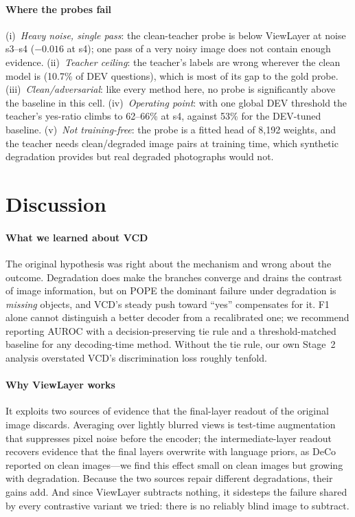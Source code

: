 \documentclass[10pt,a4paper]{article}
\newcommand{\ours}{ViewLayer}
\begin{document}
\paragraph{Where the probes fail} (i)~\emph{Heavy noise, single pass}: the clean-teacher probe is below \ours{} at noise s3--s4 ($-0.016$ at s4); one pass of a very noisy image does not contain enough evidence. (ii)~\emph{Teacher ceiling}: the teacher's labels are wrong wherever the clean model is (10.7\% of DEV questions), which is most of its gap to the gold probe. (iii)~\emph{Clean/adversarial}: like every method here, no probe is significantly above the baseline in this cell. (iv)~\emph{Operating point}: with one global DEV threshold the teacher's yes-ratio climbs to 62--66\% at s4, against 53\% for the DEV-tuned baseline. (v)~\emph{Not training-free}: the probe is a fitted head of 8{,}192 weights, and the teacher needs clean/degraded image pairs at training time, which synthetic degradation provides but real degraded photographs would not.

\section{Discussion}\label{sec:discussion}
\paragraph{What we learned about VCD} The original hypothesis was right about the mechanism and wrong about the outcome. Degradation does make the branches converge and drains the contrast of image information, but on POPE the dominant failure under degradation is \emph{missing} objects, and VCD's steady push toward ``yes'' compensates for it. F1 alone cannot distinguish a better decoder from a recalibrated one; we recommend reporting AUROC with a decision-preserving tie rule and a threshold-matched baseline for any decoding-time method. Without the tie rule, our own Stage~2 analysis overstated VCD's discrimination loss roughly tenfold.

\paragraph{Why \ours{} works} It exploits two sources of evidence that the final-layer readout of the original image discards. Averaging over lightly blurred views is test-time augmentation~\citep{shanmugam2021tta} that suppresses pixel noise before the encoder; the intermediate-layer readout recovers evidence that the final layers overwrite with language priors, as DeCo~\citep{wang2025deco} reported on clean images---we find this effect small on clean images but growing with degradation. Because the two sources repair different degradations, their gains add. And since \ours{} subtracts nothing, it sidesteps the failure shared by every contrastive variant we tried: there is no reliably blind image to subtract.
\end{document}
